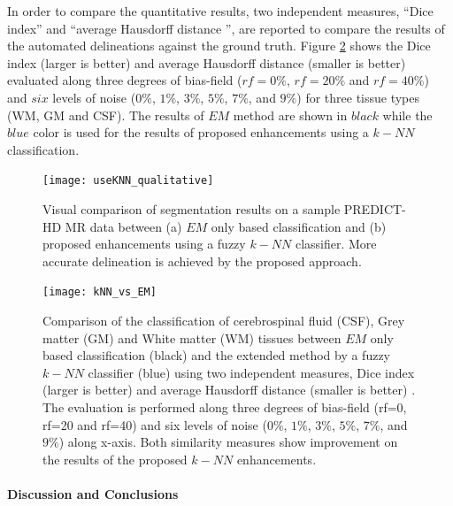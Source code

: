 In  order  to  compare  the  quantitative  results, two independent measures, ``Dice index'' and ``average Hausdorff distance \cite{Dubuisson1994}'', are reported to compare the results of the automated delineations against the ground truth. Figure \ref{kNN_vs_EM} shows the Dice index (larger is better) and average Hausdorff distance (smaller is better) evaluated along three degrees of bias-field ($rf=0\%$, $rf=20\%$ and $rf=40\%$) and $six$ levels of noise ($0\%$, $1\%$, $3\%$, $5\%$, $7\%$, and $9\%$) for three tissue types (WM, GM and CSF). The results of $EM$ method are shown in $black$ while the $blue$ color is used for the results of proposed enhancements using a $k-NN$ classification.

\begin{figure}
\centering
\texttt{[image: useKNN\_qualitative]}\
\centering
\caption{Visual comparison of segmentation results on a sample PREDICT-HD MR data between (a) $EM$ only based classification and (b) proposed enhancements using a fuzzy $k-NN$ classifier. More accurate delineation is achieved by the proposed approach.}
\label{useKNN_qualitative}
\end{figure}

\begin{figure}
\centering
\texttt{[image: kNN\_vs\_EM]}\
\centering
\caption{Comparison of the classification of cerebrospinal fluid (CSF), Grey matter (GM) and White matter (WM) tissues between $EM$ only based classification (black) and the extended method by a fuzzy $k-NN$ classifier (blue) using two independent measures, Dice index (larger is better) and average Hausdorff distance (smaller is better) . The evaluation is performed along three degrees of bias-field (rf=0, rf=20 and rf=40) and six levels of noise ($0\%$, $1\%$, $3\%$, $5\%$, $7\%$, and $9\%$) along x-axis. Both similarity measures show improvement on the results of the proposed $k-NN$ enhancements.}
\label{kNN_vs_EM}
\end{figure}

\paragraph{Discussion and Conclusions} %

